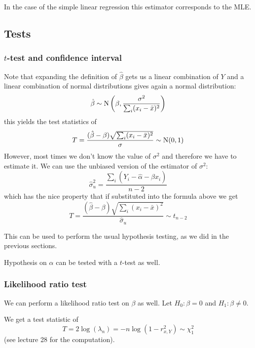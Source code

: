 \documentclass[12pt]{extarticle}
\newcommand{\Normal}{{\operatorfont N}}
\begin{document}
In the case of the simple linear regression this estimator corresponds to the MLE.

\subsection{Tests}

\subsubsection{\texorpdfstring{$t$}{t}-test and confidence interval}

Note that expanding the definition of $\hat \beta$ gets us a linear combination of $Y$
and a linear combination of normal distributions gives again a normal distribution:
\begin{equation}
	\hat \beta \sim \Normal\left(\beta, \frac{\sigma^2}{\sum_i (x_i - \bar x)^2}\right)
\end{equation}
this yields the test statistics of
\begin{equation}
	T = \frac{(\hat \beta - \beta)\sqrt{\sum_i (x_i - \bar x)^2}}{\sigma} \sim \Normal(0, 1)
\end{equation}
However, most times we don't know the value of $\sigma^2$ and therefore we have to estimate it.
We can use the unbiased version of the estimator of $\sigma^2$:
\begin{equation}
	\hat \sigma^2_u = \frac{\sum_i (Y_i - \hat \alpha - \hat \beta x_i)}{n-2}
	\label{eq:unbiased-est-var-slr}
\end{equation}
which has the nice property that if substituted into the formula above we get
\begin{equation}
	T = \frac{(\hat \beta - \beta)\sqrt{\sum_i (x_i - \bar x)^2}}{\hat \sigma_u} \sim t_{n -2}
\end{equation}

This can be used to perform the usual hypothesis testing, as we did in the previous sections.

Hypothesis on $\alpha$ can be tested with a $t$-test as well.

\subsubsection{Likelihood ratio test}
We can perform a likelihood ratio test on $\beta$ as well.
Let $H_0: \beta = 0$ and $H_1: \beta \neq 0$.

We get a test statistic of
\begin{equation}
	T = 2 \log(\lambda_n) = -n \log(1-r^2_{x, Y}) \sim \chi^2_1
\end{equation}
(see lecture 28 for the computation).
\end{document}
